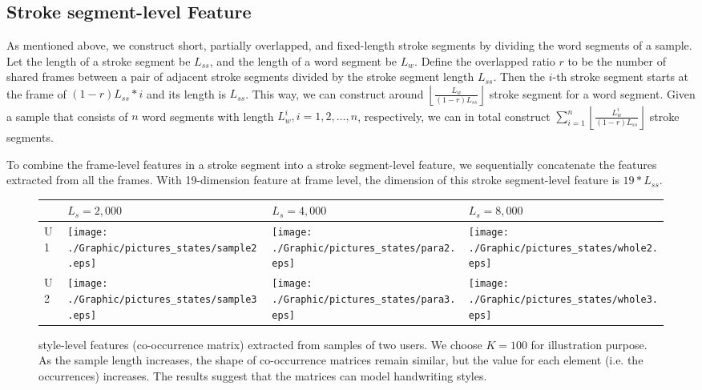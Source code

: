 \subsection{Stroke segment-level Feature}


As mentioned above, we construct short, partially overlapped, and fixed-length stroke segments by dividing the word segments of a sample. Let the length of a stroke segment be $L_{ss}$, and the length of a word segment be $L_w$. 
Define the overlapped ratio $r$ to be the number of shared frames between a pair of adjacent stroke segments divided by the stroke segment length $L_{ss}$. Then the $i$-th stroke segment starts at the frame of $(1-r)L_{ss} * i$ and its length is $L_{ss}$. 
This way, we can construct around $\left \lfloor\frac{L_w}{(1-r)L_{ss}}\right \rfloor$ stroke segment for a word segment.
Given a sample that consists of $n$ word segments with length $L^i_{w}, i=1,2,\ldots, n$, respectively, we can in total construct 
$\sum^n_{i=1} \left \lfloor \frac{L^i_w}{(1-r)L_{ss}}\right \rfloor$ stroke segments. 



To combine the frame-level features in a stroke segment into a stroke segment-level feature,  we sequentially concatenate the features extracted from all the frames. With 19-dimension feature at frame level, the dimension of this stroke segment-level feature is $19 * L_{ss}$.




 \begin{figure}[!t]
 \vspace{2mm}
 \scriptsize
 \centering
     \begin{tabular}{ m{0.2cm}  m{2.2cm} m{2.2cm} m{2.2cm} }
     \hline
   	   & \textbf{$L_s = 2,000$} & \textbf{$L_s = 4,000$} & \textbf{$L_s = 8,000$} \tabularnewline \hline \hline
     	U1
    & {\texttt{[image: ./Graphic/pictures\_states/sample2.eps]}}
    & {\texttt{[image: ./Graphic/pictures\_states/para2.eps]}}
	& {\texttt{[image: ./Graphic/pictures\_states/whole2.eps]}}\tabularnewline \hline
		U2
    & {\texttt{[image: ./Graphic/pictures\_states/sample3.eps]}}
    & {\texttt{[image: ./Graphic/pictures\_states/para3.eps]}}
	& {\texttt{[image: ./Graphic/pictures\_states/whole3.eps]}}\tabularnewline \hline
\end{tabular}
\vspace{-0mm}
\caption {{style-level features (co-occurrence matrix) extracted from samples of two users. We choose $K=100$ for illustration purpose.
 As the sample length increases, the shape of co-occurrence matrices remain similar, but the value for each element (i.e. the occurrences) increases. The results suggest that the matrices can model handwriting styles.
 }\vspace{-2mm}}\label{tab:sample-para-whole}
\end{figure}

